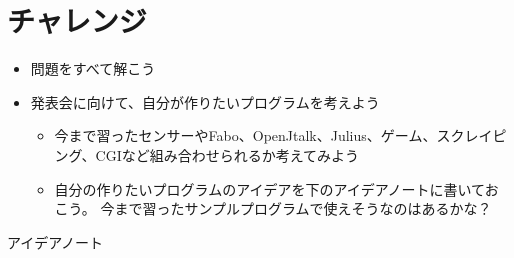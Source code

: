 \documentclass[text08.tex]{subfiles}
\begin{document}
\clearpage
{}\label{P:challenge}
\section{チャレンジ}
\begin{itemize}
\item 問題をすべて解こう
\item
発表会に向けて、自分が作りたいプログラムを考えよう

\begin{itemize}
\item
今まで習ったセンサーやFabo、OpenJtalk、Julius、ゲーム、スクレイピング、CGIなど組み合わせられるか考えてみよう
\item
自分の作りたいプログラムのアイデアを下のアイデアノートに書いておこう。
		今まで習ったサンプルプログラムで使えそうなのはあるかな？
\end{itemize}
\end{itemize}
アイデアノート

% 	　　　　　　　　　　　　　　　　　　　　　　　　　
\end{document}
